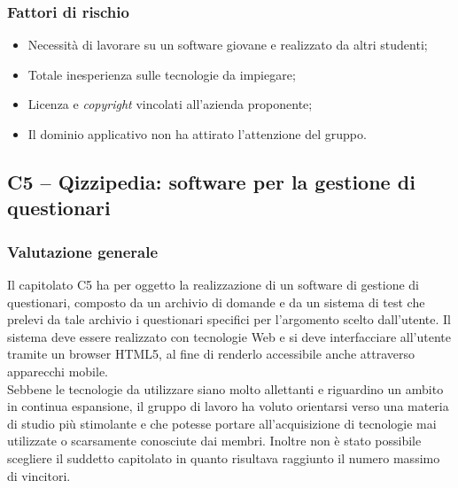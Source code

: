 \subsubsection{Fattori di rischio}
\begin{itemize}
\item Necessità di lavorare su un software giovane e realizzato da altri studenti;
\item Totale inesperienza sulle tecnologie da impiegare;
\item Licenza e \textit{copyright} vincolati all'azienda proponente;
\item Il dominio applicativo non ha attirato l'attenzione del gruppo.
\end{itemize}

\subsection{C5 – Qizzipedia: software per la gestione di questionari}
\subsubsection{Valutazione generale}
Il capitolato C5 ha per oggetto la realizzazione di un software di gestione di questionari, composto da un archivio di domande e da un sistema di test che prelevi da tale archivio i questionari specifici per l'argomento scelto dall'utente. Il sistema deve essere realizzato con tecnologie Web e si deve interfacciare all'utente tramite un browser HTML5, al fine di renderlo accessibile anche attraverso apparecchi mobile.\\
Sebbene le tecnologie da utilizzare siano molto allettanti e riguardino un ambito in continua espansione, il gruppo di lavoro ha voluto orientarsi verso una materia di studio più stimolante e che potesse portare all'acquisizione di tecnologie mai utilizzate o scarsamente conosciute dai membri. Inoltre non è stato possibile scegliere il suddetto capitolato in quanto risultava raggiunto il numero massimo di vincitori.


